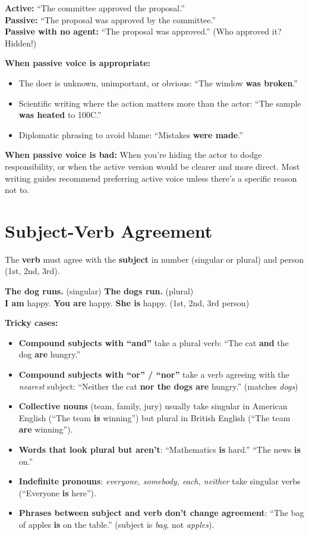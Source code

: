 \documentclass[11pt, letterpaper]{article}
\newcommand{\example}[1]{%
  \begin{tcolorbox}[colback=exbg, colframe=exborder,
    title={\bfseries Example}, arc=3pt, boxrule=1pt]
  #1
  \end{tcolorbox}%
}
\begin{document}
\example{
\textbf{Active:} ``The committee approved the proposal.''\\
\textbf{Passive:} ``The proposal was approved by the committee.''\\
\textbf{Passive with no agent:} ``The proposal was approved.'' (Who approved it? Hidden!)
}

\textbf{When passive voice is appropriate:}
\begin{itemize}[noitemsep]
  \item The doer is unknown, unimportant, or obvious: ``The window \textbf{was broken}.''
  \item Scientific writing where the action matters more than the actor: ``The sample \textbf{was heated} to 100\textdegree C.''
  \item Diplomatic phrasing to avoid blame: ``Mistakes \textbf{were made}.''
\end{itemize}

\textbf{When passive voice is bad:}
When you're hiding the actor to dodge responsibility, or when the active version would be clearer and more direct. Most writing guides recommend preferring active voice unless there's a specific reason not to.

\section*{Subject-Verb Agreement}

The \textbf{verb} must agree with the \textbf{subject} in number (singular or plural) and person (1st, 2nd, 3rd).

\example{
\textbf{The dog runs.} (singular) \quad \textbf{The dogs run.} (plural)\\
\textbf{I am} happy. \textbf{You are} happy. \textbf{She is} happy. (1st, 2nd, 3rd person)
}

\textbf{Tricky cases:}
\begin{itemize}[noitemsep]
  \item \textbf{Compound subjects with ``and''} take a plural verb: ``The cat \textbf{and} the dog \textbf{are} hungry.''
  \item \textbf{Compound subjects with ``or'' / ``nor''} take a verb agreeing with the \emph{nearest} subject: ``Neither the cat \textbf{nor the dogs are} hungry.'' (matches \emph{dogs})
  \item \textbf{Collective nouns} (team, family, jury) usually take singular in American English (``The team \textbf{is} winning'') but plural in British English (``The team \textbf{are} winning'').
  \item \textbf{Words that look plural but aren't}: ``Mathematics \textbf{is} hard.'' ``The news \textbf{is} on.''
  \item \textbf{Indefinite pronouns}: \emph{everyone, somebody, each, neither} take singular verbs (``Everyone \textbf{is} here'').
  \item \textbf{Phrases between subject and verb don't change agreement}: ``The bag of apples \textbf{is} on the table.'' (subject is \emph{bag}, not \emph{apples}).
\end{itemize}
\end{document}
